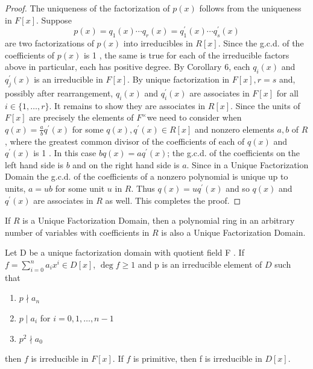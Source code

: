 \begin{theorem}
\begin{proof}
        The uniqueness of the factorization of $p(x)$ follows from the uniqueness in $F[x]$. Suppose
        \begin{equation*}
            p(x)=q_1(x) \cdots q_r(x)=q_1^{\prime}(x) \cdots q_s^{\prime}(x)
        \end{equation*}
        are two factorizations of $p(x)$ into irreducibles in $R[x]$. Since the g.c.d. of the coefficients of $p(x)$ is 1 , the same is true for each of the irreducible factors above in particular, each has positive degree. By Corollary 6, each $q_i(x)$ and $q_j^{\prime}(x)$ is an irreducible in $F[x]$. By unique factorization in $F[x], r=s$ and, possibly after rearrangement, $q_i(x)$ and $q_i^{\prime}(x)$ are associates in $F[x]$ for all $i \in\{1, \ldots, r\}$. It remains to show they are associates in $R[x]$. Since the units of $F[x]$ are precisely the elements of $F^{\times}$we need to consider when $q(x)=\frac{a}{b} q^{\prime}(x)$ for some $q(x), q^{\prime}(x) \in R[x]$ and nonzero elements $a, b$ of $R$, where the greatest common divisor of the coefficients of each of $q(x)$ and $q^{\prime}(x)$ is 1 . In this case $b q(x)=a q^{\prime}(x)$; the g.c.d. of the coefficients on the left hand side is $b$ and on the right hand side is $a$. Since in a Unique Factorization Domain the g.c.d. of the coefficients of a nonzero polynomial is unique up to units, $a=u b$ for some unit $u$ in $R$. Thus $q(x)=u q^{\prime}(x)$ and so $q(x)$ and $q^{\prime}(x)$ are associates in $R$ as well. This completes the proof.
    \end{proof}
\end{theorem}


\begin{corollary}
    If $R$ is a Unique Factorization Domain, then a polynomial ring in an arbitrary number of variables with coefficients in $R$ is also a Unique Factorization Domain.
\end{corollary}

\begin{theorem}
    Let D be a unique factorization domain with quotient field F . If $f=\sum_{i=0}^n a_{i} x^{i} \in D[x]$, $\operatorname{deg} f \geq 1$ and p is an irreducible element of $D$ such that
    \begin{enumerate}[label=(\roman*)]
        \item $p \nmid a_{n}$
        \item $p \mid a_{i}$ for $i=0,1,\ldots,n-1$
        \item $p^2 \nmid a_0$
    \end{enumerate}
    then $f$ is irreducible in $F[x]$.
    If $f$ is primitive, then f is irreducible in $D[x]$.
\end{theorem}












